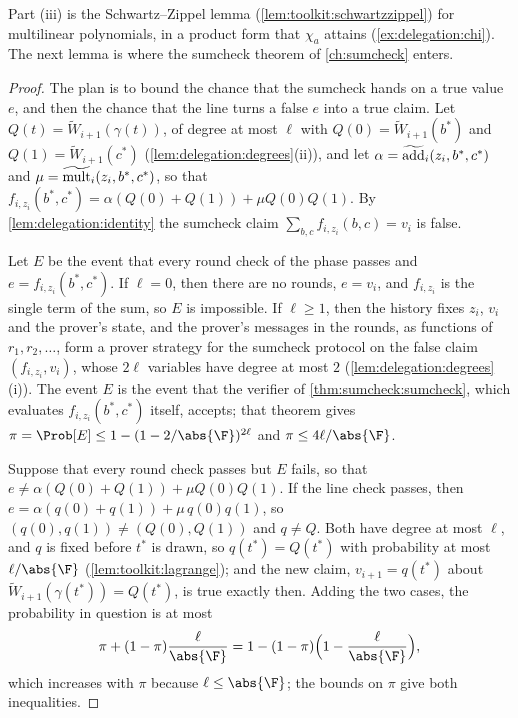 \begin{refsection}
Part (iii) is the Schwartz--Zippel lemma (\cref{lem:toolkit:schwartzzippel}) for multilinear polynomials, in a product form that $\chi_a$ attains (\cref{ex:delegation:chi}). The next lemma is where the sumcheck theorem of \cref{ch:sumcheck} enters.


\begin{proof}
The plan is to bound the chance that the sumcheck hands on a true value $e$, and then the chance that the line turns a false $e$ into a true claim. Let $Q(t)=\tilde W_{i+1}(\gamma(t))$, of degree at most $\ell$ with $Q(0)=\tilde W_{i+1}(b^*)$ and $Q(1)=\tilde W_{i+1}(c^*)$ (\cref{lem:delegation:degrees}(ii)), and let $\alpha=\widetilde{\mathrm{add}}_i(z_i,b^*,c^*)$ and $\mu=\widetilde{\mathrm{mult}}_i(z_i,b^*,c^*)$, so that $f_{i,z_i}(b^*,c^*)=\alpha(Q(0)+Q(1))+\mu Q(0)Q(1)$. By \cref{lem:delegation:identity} the sumcheck claim $\sum_{b,c}f_{i,z_i}(b,c)=v_i$ is false.

Let $E$ be the event that every round check of the phase passes and $e=f_{i,z_i}(b^*,c^*)$. If $\ell=0$, then there are no rounds, $e=v_i$, and $f_{i,z_i}$ is the single term of the sum, so $E$ is impossible. If $\ell\ge1$, then the history fixes $z_i$, $v_i$ and the prover's state, and the prover's messages in the rounds, as functions of $r_1,r_2,\dots$, form a prover strategy for the sumcheck protocol on the false claim $(f_{i,z_i},v_i)$, whose $2\ell$ variables have degree at most $2$ (\cref{lem:delegation:degrees}(i)). The event $E$ is the event that the verifier of \cref{thm:sumcheck:sumcheck}, which evaluates $f_{i,z_i}(b^*,c^*)$ itself, accepts; that theorem gives $\pi=\Prob[E]\le1-(1-2/\abs{\F})^{2\ell}$ and $\pi\le4\ell/\abs{\F}$.

Suppose that every round check passes but $E$ fails, so that $e\ne\alpha(Q(0)+Q(1))+\mu Q(0)Q(1)$. If the line check passes, then $e=\alpha(q(0)+q(1))+\mu\,q(0)q(1)$, so $(q(0),q(1))\ne(Q(0),Q(1))$ and $q\ne Q$. Both have degree at most $\ell$, and $q$ is fixed before $t^*$ is drawn, so $q(t^*)=Q(t^*)$ with probability at most $\ell/\abs{\F}$ (\cref{lem:toolkit:lagrange}); and the new claim, $v_{i+1}=q(t^*)$ about $\tilde W_{i+1}(\gamma(t^*))=Q(t^*)$, is true exactly then. Adding the two cases, the probability in question is at most
\[
\pi+(1-\pi)\frac{\ell}{\abs{\F}}=1-(1-\pi)\Bigl(1-\frac{\ell}{\abs{\F}}\Bigr),
\]
which increases with $\pi$ because $\ell\le\abs{\F}$; the bounds on $\pi$ give both inequalities.
\end{proof}


\end{refsection}
